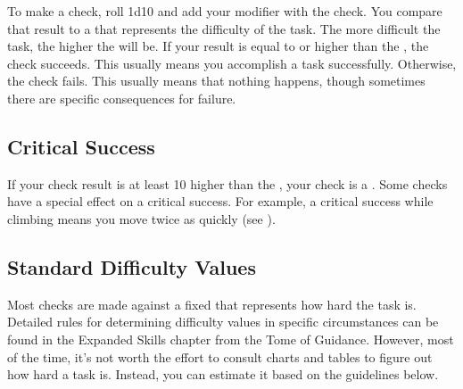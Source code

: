     To make a check, roll 1d10 and add your modifier with the check.
    You compare that result to a  that represents the difficulty of the task.
    The more difficult the task, the higher the  will be.
    If your result is equal to or higher than the , the check succeeds.
    This usually means you accomplish a task successfully.
    Otherwise, the check fails.
    This usually means that nothing happens, though sometimes there are specific consequences for failure.

    \subsection{Critical Success}
        If your check result is at least 10 higher than the , your check is a .
        Some checks have a special effect on a critical success.
        For example, a critical success while climbing means you move twice as quickly (see ).

    \subsection{Standard Difficulty Values}\label{Standard Difficulty Values}
        Most checks are made against a fixed  that represents how hard the task is.
        Detailed rules for determining difficulty values in specific circumstances can be found in the Expanded Skills chapter from the Tome of Guidance.
        However, most of the time, it's not worth the effort to consult charts and tables to figure out how hard a task is.
        Instead, you can estimate it based on the guidelines below.

